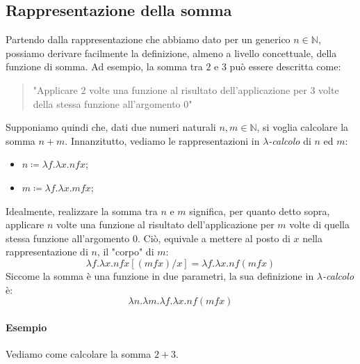 \documentclass[12pt, a4paper]{report}
\theoremstyle{definition}
\begin{document}
\subsection{Rappresentazione della somma}
Partendo dalla rappresentazione che abbiamo dato per un generico $n\in\mathbb{N}$,
possiamo derivare facilmente la definizione, almeno a livello concettuale, della
funzione di somma. Ad esempio, la somma tra $2$ e $3$ può essere descritta come:

\begin{quote}
    "Applicare 2 volte una funzione al risultato dell'applicazione per 3 volte
    della stessa funzione all'argomento 0"
\end{quote}
Supponiamo quindi che, dati due numeri naturali \(n,m\in\mathbb{N}\), si voglia
calcolare la somma \(n+m\). Innanzitutto, vediamo le rappresentazioni in
\emph{$\lambda$-calcolo} di $n$ ed $m$:
\begin{itemize}
    \item \(n\coloneqq\lambda f.\lambda x.nfx\);
    \item \(m\coloneqq\lambda f.\lambda x.mfx\);
\end{itemize}
Idealmente, realizzare la somma tra $n$ e $m$ significa, per quanto detto sopra,
applicare $n$ volte una funzione al risultato dell'applicazione per $m$ volte di
quella stessa funzione all'argomento 0. Ciò, equivale a mettere al posto di $x$
nella rappresentazione di $n$, il "corpo" di $m$:
\[\lambda f.\lambda x.nfx[(mfx)/x]=\lambda f.\lambda x.nf(mfx)\]
Siccome la somma è una funzione in due parametri, la sua definizione in
\emph{$\lambda$-calcolo} è:
\[\lambda n.\lambda m.\lambda f.\lambda x.nf(mfx)\]

\paragraph*{Esempio}
Vediamo come calcolare la somma $2+3$.
\end{document}
